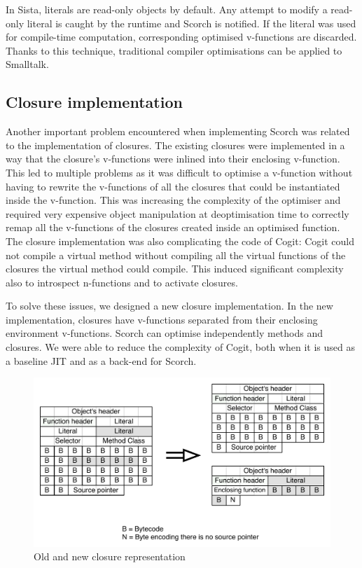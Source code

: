 \documentclass[a4paper,12pt,twoside]{../includes/ThesisStyle}
\begin{document}
In Sista, literals are read-only objects by default. Any attempt to modify a read-only literal is caught by the runtime and Scorch is notified. If the literal was used for compile-time computation, corresponding optimised v-functions are discarded. Thanks to this technique, traditional compiler optimisations can be applied to Smalltalk.

\subsection{Closure implementation}

Another important problem encountered when implementing Scorch was related to the implementation of closures. The existing closures were implemented in a way that the closure's v-functions were inlined into their enclosing v-function. This led to multiple problems as it was difficult to optimise a v-function without having to rewrite the v-functions of all the closures that could be instantiated inside the v-function. This was increasing the complexity of the optimiser and required very expensive object manipulation at deoptimisation time to correctly remap all the v-functions of the closures created inside an optimised function. The closure implementation was also complicating the code of Cogit: Cogit could not compile a virtual method without compiling all the virtual functions of the closures the virtual method could compile. This induced significant complexity also to introspect n-functions and to activate closures. 

To solve these issues, we designed a new closure implementation. In the new implementation, closures have v-functions separated from their enclosing environment v-functions. Scorch can optimise independently methods and closures. We were able to reduce the complexity of Cogit, both when it is used as a baseline JIT and as a back-end for Scorch.

\begin{figure}[h!]
    \begin{center}
        \includegraphics[width=0.85\linewidth]{CompiledBlock}
        \caption{Old and new closure representation}
        \label{fig:CompiledBlock}
    \end{center}
\end{figure}
\end{document}

